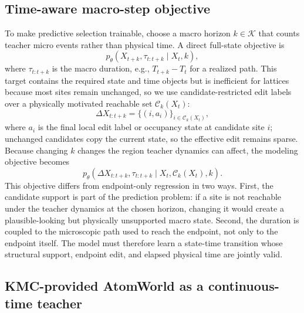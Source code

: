 \documentclass{article}
\begin{document}
\subsection{Time-aware macro-step objective}

To make predictive selection trainable, choose a macro horizon $k\in\mathcal{K}$ that counts teacher micro events rather than physical time. A direct full-state objective is
\begin{equation}
p_\theta(X_{t+k},\tau_{t:t+k}\mid X_t,k),
\end{equation}
where $\tau_{t:t+k}$ is the macro duration, e.g., $T_{t+k}-T_t$ for a realized path. This target contains the required state and time objects but is inefficient for lattices because most sites remain unchanged, so we use candidate-restricted edit labels over a physically motivated reachable set $\mathcal{C}_k(X_t)$:
\begin{equation}
\Delta X_{t:t+k}=\{(i,a_i)\}_{i\in\mathcal{C}_k(X_t)},
\end{equation}
where $a_i$ is the final local edit label or occupancy state at candidate site $i$; unchanged candidates copy the current state, so the effective edit remains sparse. Because changing $k$ changes the region teacher dynamics can affect, the modeling objective becomes
\begin{equation}
p_\theta(\Delta X_{t:t+k},\tau_{t:t+k}\mid X_t,\mathcal{C}_k(X_t),k).
\end{equation}
This objective differs from endpoint-only regression in two ways. First, the candidate support is part of the prediction problem: if a site is not reachable under the teacher dynamics at the chosen horizon, changing it would create a plausible-looking but physically unsupported macro state. Second, the duration is coupled to the microscopic path used to reach the endpoint, not only to the endpoint itself. The model must therefore learn a state-time transition whose structural support, endpoint edit, and elapsed physical time are jointly valid.

\subsection{KMC-provided AtomWorld as a continuous-time teacher}
\end{document}
